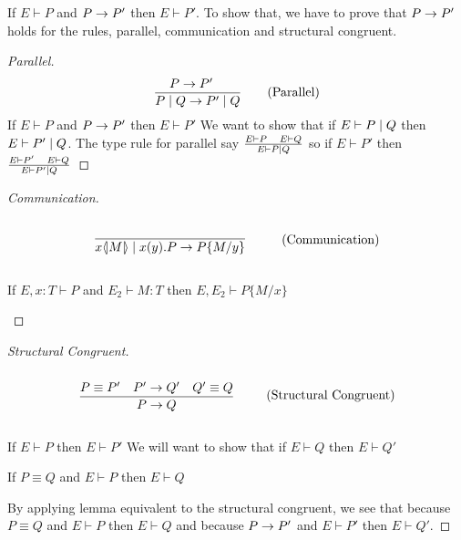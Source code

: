 \begin{theorem}
If \ensuremath{E \vdash P} and \ensuremath{P\ra P'} then \ensuremath{E \vdash P'}.
To show that, we have to prove that \ensuremath{P \ra P'} holds for the rules, parallel, communication and structural congruent.

\begin{proof}[Parallel]
\begin{align*}
    \frac{P \rightarrow P' \quad}{P \mid Q \rightarrow P' \mid Q} \tag{Parallel}
\end{align*}
If \ensuremath{E \vdash P} and \ensuremath{P \ra P'} then \ensuremath{E \vdash P'} We want to show that if \ensuremath{E \vdash P \para Q} then \ensuremath{E \vdash P' \para Q}. The type rule for parallel say \ensuremath{\frac{E \vdash P\quad E \vdash Q}{E \vdash P \para Q}} so if \ensuremath{E \vdash P'} then \ensuremath{\frac{E \vdash P' \quad E \vdash Q}{E \vdash P' \para Q}}
\end{proof}

\begin{proof}[Communication]
\begin{align*}
    \infrule{}{\lift{x}{M}\para\inp{x}{y}P\ra P\{M/y\}} \tag{Communication}
\end{align*}

\begin{lemma}[Substitution]
If \ensuremath{E,x:T \vdash P} and \ensuremath{E_2 \vdash M:T} then \ensuremath{E, E_2 \vdash P\{M/x \}}
\end{lemma}

\end{proof}

\begin{proof}[Structural Congruent]
\begin{align*}
    \infrule{P \equiv P' \quad P' \ra Q' \quad Q' \equiv Q}{P \ra Q} \tag{Structural Congruent}
\end{align*}

If \ensuremath{E \vdash P} then \ensuremath{E \vdash P'} We will want to show that if \ensuremath{E \vdash Q} then \ensuremath{E \vdash Q'}

\begin{lemma}[Equivalent]
If \ensuremath{P \equiv Q} and \ensuremath{E \vdash P} then \ensuremath{E \vdash Q}
\end{lemma}

By applying lemma equivalent to the structural congruent, we see that because \ensuremath{P \equiv Q} and \ensuremath{E \vdash P} then \ensuremath{E \vdash Q} and because \ensuremath{P \ra P'} and \ensuremath{E \vdash P'} then \ensuremath{E \vdash Q'}.
\end{proof}

\end{theorem}


